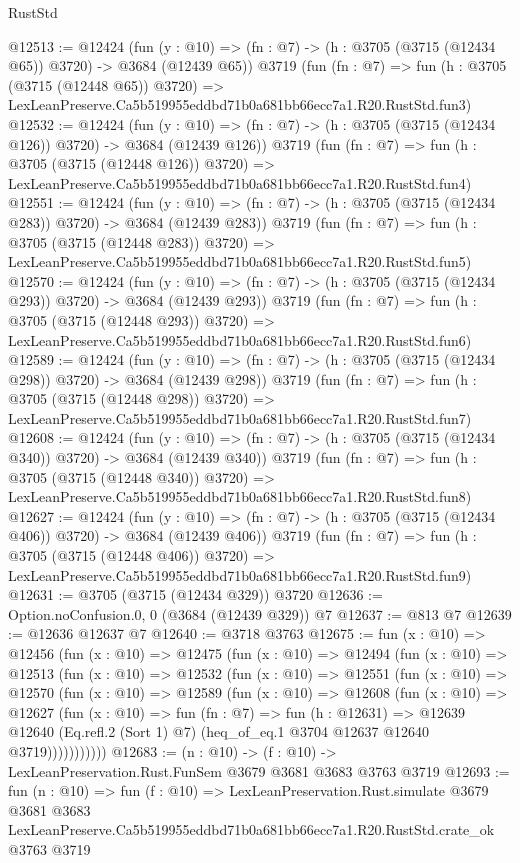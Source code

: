 \begin{lexlean}{RustStd}
\begin{coremodule}
@12513 := @12424
    (fun (y : @10) => (fn : @7) -> (h : @3705 (@3715 (@12434 @65)) @3720) -> @3684 (@12439 @65))
    @3719
    (fun (fn : @7) =>
    fun (h : @3705 (@3715 (@12448 @65)) @3720) =>
    LexLeanPreserve.Ca5b519955eddbd71b0a681bb66ecc7a1.R20.RustStd.fun3)
@12532 := @12424
    (fun (y : @10) => (fn : @7) -> (h : @3705 (@3715 (@12434 @126)) @3720) -> @3684 (@12439 @126))
    @3719
    (fun (fn : @7) =>
    fun (h : @3705 (@3715 (@12448 @126)) @3720) =>
    LexLeanPreserve.Ca5b519955eddbd71b0a681bb66ecc7a1.R20.RustStd.fun4)
@12551 := @12424
    (fun (y : @10) => (fn : @7) -> (h : @3705 (@3715 (@12434 @283)) @3720) -> @3684 (@12439 @283))
    @3719
    (fun (fn : @7) =>
    fun (h : @3705 (@3715 (@12448 @283)) @3720) =>
    LexLeanPreserve.Ca5b519955eddbd71b0a681bb66ecc7a1.R20.RustStd.fun5)
@12570 := @12424
    (fun (y : @10) => (fn : @7) -> (h : @3705 (@3715 (@12434 @293)) @3720) -> @3684 (@12439 @293))
    @3719
    (fun (fn : @7) =>
    fun (h : @3705 (@3715 (@12448 @293)) @3720) =>
    LexLeanPreserve.Ca5b519955eddbd71b0a681bb66ecc7a1.R20.RustStd.fun6)
@12589 := @12424
    (fun (y : @10) => (fn : @7) -> (h : @3705 (@3715 (@12434 @298)) @3720) -> @3684 (@12439 @298))
    @3719
    (fun (fn : @7) =>
    fun (h : @3705 (@3715 (@12448 @298)) @3720) =>
    LexLeanPreserve.Ca5b519955eddbd71b0a681bb66ecc7a1.R20.RustStd.fun7)
@12608 := @12424
    (fun (y : @10) => (fn : @7) -> (h : @3705 (@3715 (@12434 @340)) @3720) -> @3684 (@12439 @340))
    @3719
    (fun (fn : @7) =>
    fun (h : @3705 (@3715 (@12448 @340)) @3720) =>
    LexLeanPreserve.Ca5b519955eddbd71b0a681bb66ecc7a1.R20.RustStd.fun8)
@12627 := @12424
    (fun (y : @10) => (fn : @7) -> (h : @3705 (@3715 (@12434 @406)) @3720) -> @3684 (@12439 @406))
    @3719
    (fun (fn : @7) =>
    fun (h : @3705 (@3715 (@12448 @406)) @3720) =>
    LexLeanPreserve.Ca5b519955eddbd71b0a681bb66ecc7a1.R20.RustStd.fun9)
@12631 := @3705 (@3715 (@12434 @329)) @3720
@12636 := Option.noConfusion.{0, 0} (@3684 (@12439 @329)) @7
@12637 := @813 @7
@12639 := @12636 @12637 @7
@12640 := @3718 @3763
@12675 := fun (x : @10) =>
  @12456
    (fun (x : @10) =>
    @12475
      (fun (x : @10) =>
      @12494
        (fun (x : @10) =>
        @12513
          (fun (x : @10) =>
          @12532
            (fun (x : @10) =>
            @12551
              (fun (x : @10) =>
              @12570
                (fun (x : @10) =>
                @12589
                  (fun (x : @10) =>
                  @12608
                    (fun (x : @10) =>
                    @12627
                      (fun (x : @10) =>
                      fun (fn : @7) =>
                      fun (h : @12631) =>
                      @12639
                        @12640
                        (Eq.refl.{2} (Sort 1) @7)
                        (heq_of_eq.{1} @3704 @12637 @12640 @3719)))))))))))
@12683 := (n : @10) -> (f : @10) -> LexLeanPreservation.Rust.FunSem @3679 @3681 @3683 @3763 @3719
@12693 := fun (n : @10) =>
  fun (f : @10) =>
  LexLeanPreservation.Rust.simulate
    @3679
    @3681
    @3683
    LexLeanPreserve.Ca5b519955eddbd71b0a681bb66ecc7a1.R20.RustStd.crate_ok
    @3763
    @3719
\end{coremodule}
\end{lexlean}
